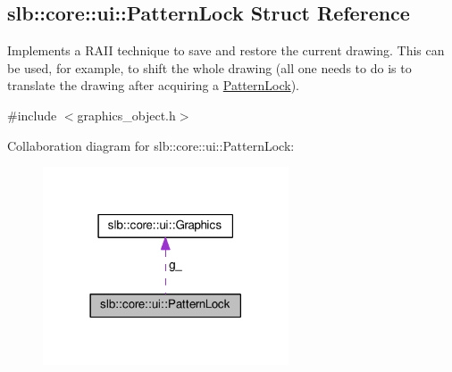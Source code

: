 \hypertarget{structslb_1_1core_1_1ui_1_1PatternLock}{}\subsection{slb\+:\+:core\+:\+:ui\+:\+:Pattern\+Lock Struct Reference}
\label{structslb_1_1core_1_1ui_1_1PatternLock}


Implements a R\+A\+II technique to save and restore the current drawing. This can be used, for example, to shift the whole drawing (all one needs to do is to translate the drawing after acquiring a \hyperlink{structslb_1_1core_1_1ui_1_1PatternLock}{Pattern\+Lock}).  




{\ttfamily \#include $<$graphics\+\_\+object.\+h$>$}



Collaboration diagram for slb\+:\+:core\+:\+:ui\+:\+:Pattern\+Lock\+:\nopagebreak
\begin{figure}[H]
\begin{center}
\leavevmode
\includegraphics[width=206pt]{structslb_1_1core_1_1ui_1_1PatternLock__coll__graph}
\end{center}
\end{figure}
